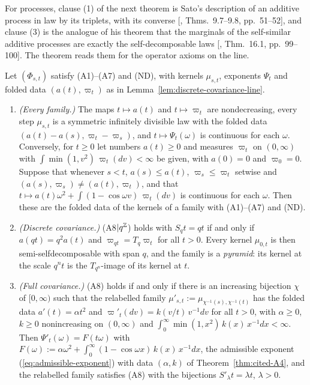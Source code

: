 For processes, clause (1) of the next theorem is Sato's description of an additive process in law
by its triplets, with its converse [, Thms.~9.7--9.8, pp.~51--52], and
clause (3) is the analogue of his theorem that the marginals of the self-similar additive
processes are exactly the self-decomposable laws [, Thm.~16.1, pp.~99--100]. The theorem reads them for
the operator axioms on the line.

\begin{theorem}
\label{thm:lattice-line}

Let $(\Phi_{s,t})$ satisfy (A1)--(A7) and (ND), with kernels $\mu_{s,t}$, exponents $\Psi_t$ and
folded data $(a(t), \varpi_t)$ as in Lemma~\ref{lem:discrete-covariance-line}.
\begin{enumerate}
\item \emph{(Every family.)} The maps $t \mapsto a(t)$ and $t \mapsto \varpi_t$ are
nondecreasing, every step $\mu_{s,t}$ is a symmetric infinitely divisible law with the folded
data $(a(t) - a(s), \varpi_t - \varpi_s)$, and $t \mapsto \Psi_t(\omega)$ is continuous for each
$\omega$. Conversely, for $t \ge 0$ let numbers $a(t) \ge 0$ and measures $\varpi_t$ on
$(0,\infty)$ with $\int\min(1, v^2)\,\varpi_t(dv) < \infty$ be given, with $a(0) = 0$ and
$\varpi_0 = 0$. Suppose that whenever $s < t$, $a(s) \le a(t)$, $\varpi_s \le \varpi_t$ setwise and
$(a(s), \varpi_s) \ne (a(t), \varpi_t)$, and that
$t \mapsto a(t)\omega^2 + \int(1 - \cos\omega v)\,\varpi_t(dv)$ is continuous for each $\omega$.
Then these are the folded data of the kernels of a family with (A1)--(A7) and (ND).
\item \emph{(Discrete covariance.)} (A8$|q^{\mathbb{Z}}$) holds with $S_qt = qt$ if and only if
$a(qt) = q^2a(t)$ and $\varpi_{qt} = T_q\varpi_t$ for all $t > 0$. Every kernel $\mu_{0,t}$ is
then semi-selfdecomposable with span $q$, and the family is a \emph{pyramid}: its kernel at the
scale $q^nt$ is the $T_{q^n}$-image of its kernel at $t$.
\item \emph{(Full covariance.)} (A8) holds if and only if there is an increasing bijection $\chi$
of $[0,\infty)$ such that the relabelled family $\mu'_{s,t} := \mu_{\chi^{-1}(s),\chi^{-1}(t)}$ has
the folded data $a'(t) = \alpha t^2$ and $\varpi'_t(dv) = k(v/t)\,v^{-1}dv$ for all $t > 0$, with
$\alpha \ge 0$, $k \ge 0$ nonincreasing on $(0,\infty)$ and
$\int_0^\infty\min(1, x^2)\,k(x)\,x^{-1}dx < \infty$. Then $\Psi'_t(\omega) = F(t\omega)$ with
$F(\omega) := \alpha\omega^2 + \int_0^\infty(1 - \cos\omega x)\,k(x)\,x^{-1}dx$, the admissible
exponent (\ref{eq:admissible-exponent}) with data $(\alpha, k)$ of Theorem~\ref{thm:cited-A4}, and the relabelled family satisfies
(A8) with the bijections $S'_\lambda t = \lambda t$, $\lambda > 0$.
\end{enumerate}
\end{theorem}

